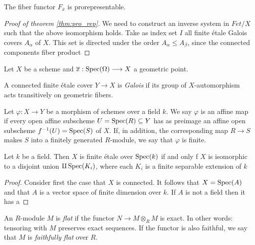 \begin{theorem}\label{thm:pro_rep}
  The fiber functor $F_{\overline{x}}$ is prorepresentable.
\end{theorem}
\begin{proof}[Proof of theorem \ref{thm:pro_rep}]
  We need to construct an inverse system in $Fet/X$ such that the above isomorphism holds. Take as index set $I$ all finite \'etale Galois covers $A_\alpha$ of $X$. This set is directed under the order $A_\alpha \le A_\beta$, since the connected components fiber product
\end{proof}

\begin{theorem}
  Let $X$ be a scheme and $\overline{x} : \operatorname{Spec}(\Omega) \longrightarrow X$ a geometric point.
\end{theorem}

\begin{definition}
  A connected finite \'etale cover $Y \to X$ is \textit{Galois} if its group of $X$-automorphism acts transitively on geometric fibers.
\end{definition}


\begin{definition}
  Let $\varphi: X \to Y$ be a morphism of schemes over a field $k$. We say $\varphi$ is an affine map if every open affine subscheme $U = \operatorname{Spec}(R) \subseteq Y$ has as preimage an affine open subscheme $f^{-1}(U) = \operatorname{Spec}(S)$ of $X$. If, in addition, the corresponding map $R \to S$ makes $S$ into a finitely generated $R$-module, we say that $\varphi$ is finite.
\end{definition}

\begin{proposition}
Let $k$ be a field. Then $X$ is finite \'etale over $\operatorname{Spec}(k)$ if and only f $X$ is isomorphic to a disjoint union $\amalg \operatorname{Spec}(K_i)$, where each $K_i$ is a finite separable extension of $k$
\end{proposition}
\begin{proof}
  Consider first the case that $X$ is connected. It follows that $X = \operatorname{Spec}(A)$ and that $A$ is a vector space of finite dimension over $k$. If $A$ is not a field then it has a
\end{proof}



\begin{definition}
   An $R$-module $M$ is \textit{flat} if the functor $N \to M \otimes_R M$ is exact. In other words: tensoring with $M$ preserves exact sequences. If the functor is also faithful, we say that $M$ is \textit{faithfully flat} over $R$.
\end{definition}

